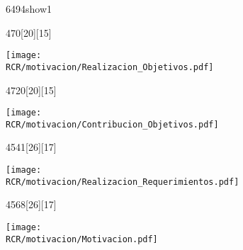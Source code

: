 \begin{NuevaPagina}{64}{94}{show1}
	\begin{NuevoParrafo}{47}{0}[20][15]
		\begin{Marco}[\LineaSupC][\LineaInfC][\LineaIzqC][\LineaDerC][CBlanco]
			\subseccionC{\PVROb}%
			\centering\texttt{[image: \\RCR/motivacion/Realizacion\_Objetivos.pdf]}
		\end{Marco}
	\end{NuevoParrafo}
	
	
	\begin{NuevoParrafo}{47}{20}[20][15]
		\begin{Marco}[\LineaSupC][\LineaInfC][\LineaIzqC][\LineaDerC][CBlanco]
			\subseccionC{\PVCOb}%
			\centering\texttt{[image: \\RCR/motivacion/Contribucion\_Objetivos.pdf]}
		\end{Marco}
	\end{NuevoParrafo}
	
	
	\begin{NuevoParrafo}{45}{41}[26][17]
		\begin{Marco}[\LineaSupC][\LineaInfC][\LineaIzqC][\LineaDerC][CBlanco]
			\subseccionC{\PVReR}%
			\centering\texttt{[image: \\RCR/motivacion/Realizacion\_Requerimientos.pdf]}
		\end{Marco}
	\end{NuevoParrafo}
	\begin{NuevoParrafo}{45}{68}[26][17]
		\begin{Marco}[\LineaSupC][\LineaInfC][\LineaIzqC][\LineaDerC][CBlanco]
			\subseccionC{\PVMot}%
			\centering\texttt{[image: \\RCR/motivacion/Motivacion.pdf]}
		\end{Marco}
	\end{NuevoParrafo}

	
	

\end{NuevaPagina}
